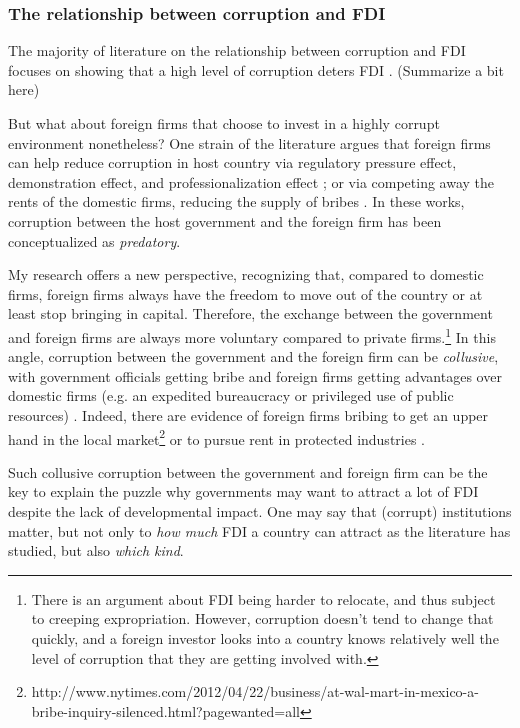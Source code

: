 \subsubsection{The relationship between corruption and FDI}

The majority of literature on the relationship between corruption and FDI focuses on showing that a high level of corruption deters FDI \citep{Wei2000, Hakkala2008, Al-Sadig2009}. (Summarize a bit here) 

But what about foreign firms that choose to invest in a highly corrupt environment nonetheless? One strain of the literature argues that foreign firms can help reduce corruption in host country via regulatory pressure effect, demonstration effect, and professionalization effect \citep{Kwok2006}; or via competing away the rents of the domestic firms, reducing the supply of bribes \citep{Sandholtz2003}. In these works, corruption between the host government and the foreign firm has been conceptualized as \textit{predatory}.

My research offers a new perspective, recognizing that, compared to domestic firms, foreign firms always have the freedom to move out of the country or at least stop bringing in capital. Therefore, the exchange between the government and foreign firms are always more voluntary compared to private firms.\footnote{There is an argument about FDI being harder to relocate, and thus subject to creeping expropriation. However, corruption doesn't tend to change that quickly, and a foreign investor looks into a country knows relatively well the level of corruption that they are getting involved with.} In this angle, corruption between the government and the foreign firm can be \textit{collusive}, with government officials getting bribe and foreign firms getting advantages over domestic firms (e.g. an expedited bureaucracy or privileged use of public resources) \citep{Hellman2002}. Indeed, there are evidence of foreign firms bribing to get an upper hand in the local market\footnote{http://www.nytimes.com/2012/04/22/business/at-wal-mart-in-mexico-a-bribe-inquiry-silenced.html?pagewanted=all} or to pursue rent in protected industries \citep{Malesky2015}. 

Such collusive corruption between the government and foreign firm can be the key to explain the puzzle why governments may want to attract a lot of FDI despite the lack of developmental impact. One may say that (corrupt) institutions matter, but not only to \textit{how much} FDI a country can attract as the literature has studied, but also \textit{which kind}.


